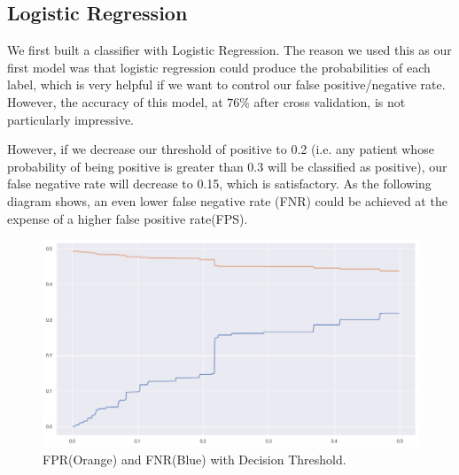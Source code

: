 \documentclass[a4paper]{article}
\begin{document}
\subsection*{Logistic Regression}
We first built a classifier with Logistic Regression. The reason we used this as our first model was that logistic regression could produce the probabilities of each label, which is very helpful if we want to control our false positive/negative rate. However, the accuracy of this model, at $76\%$ after cross validation, is not particularly impressive.\par
However, if we decrease our threshold of positive to 0.2 (i.e. any patient whose probability of being positive is greater than 0.3 will be classified as positive), our false negative rate will decrease to 0.15, which is satisfactory. As the following diagram shows, an even lower false negative rate (FNR) could be achieved at the expense of a higher false positive rate(FPS).\par
\begin{figure}[H]
\centering
\includegraphics[scale=0.265]{fps.png}
\caption{FPR(Orange) and FNR(Blue) with Decision Threshold.}
\label{COnfirmed Cases}
\end{figure}
\end{document}
